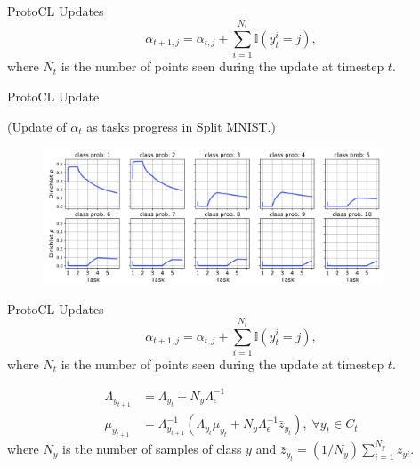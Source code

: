 \documentclass[12pt,aspectratio=169, handout]{beamer}
\begin{document}
\begin{frame}{ProtoCL Updates}
    $$\alpha_{t+1,j} = \alpha_{t,j} + \sum_{i=1}^{N_t}\mathbb{I}(y_t^i = j),$$
    where $N_t$ is the number of points seen during the update at timestep $t$.
    
    
\end{frame}

\begin{frame}{ProtoCL Update}

    (Update of $\alpha_t$ as tasks progress in Split MNIST.)
    
    \begin{figure}
		\centering
		\includegraphics[width=0.9\textwidth]{"images/FigA7_pic.png"}
	\end{figure}
\end{frame}

\begin{frame}{ProtoCL Updates}
    $$\alpha_{t+1,j} = \alpha_{t,j} + \sum_{i=1}^{N_t}\mathbb{I}(y_t^i = j),$$
    where $N_t$ is the number of points seen during the update at timestep $t$.

    \pause 
    
    \begin{align}
    \nonumber
        \Lambda_{y_{t+1}} &= \Lambda_{y_t} + N_y \Lambda_\epsilon^{-1} \\
    \nonumber
        \mu_{y_{t+1}} &= \Lambda_{y_{t+1}}^{-1}(\Lambda_{y_t}\mu_{y_t} + N_y \Lambda_\epsilon^{-1}\bar{z}_{y_t}),  \; \forall y_t \in C_t
    \end{align}
    where $N_y$ is the number of samples of class $y$ and $\bar{z}_{y_t} = (1/N_y)\sum_{i=1}^{N_y} z_{yi}$.
\end{frame}
\end{document}
